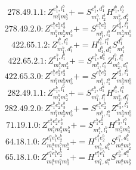 \documentclass[letterpaper,10pt,fleqn,leqno,onecolumn]{article}
\begin{document}
\begin{equation} \;\;\;\;\;\;  278.49.1.1: Z^{e_{1}^{b},l_{1}^{b}}_{m_{1}^{b}m_{2}^{b}}+=S^{e_{1}^{b},d_{1}^{b}}_{m_{1}^{b},l_{2}^{b}}H^{l_{1}^{b},l_{2}^{b}}_{m_{2}^{b},d_{1}^{b}} \end{equation}
\begin{equation} \;\;\;\;\;\;  278.49.2.0: Z^{e_{1}^{b}e_{2}^{b}e_{3}^{b}}_{m_{1}^{b}m_{2}^{b}m_{3}^{b}}+=S^{e_{1}^{b}e_{2}^{b}}_{m_{1}^{b},l_{1}^{b}}Z^{e_{3}^{b},l_{1}^{b}}_{m_{2}^{b}m_{3}^{b}} \end{equation}
\begin{equation} \;\;\;\;\;\;  422.65.1.2: Z^{l_{1}^{b},l_{1}^{a}}_{m_{1}^{b},d_{1}^{a}}+=H^{l_{1}^{b},l_{1}^{a}}_{d_{1}^{b},d_{1}^{a}}S^{d_{1}^{b}}_{m_{1}^{b}} \end{equation}
\begin{equation} \;\;\;\;\;\;  422.65.2.1: Z^{e_{1}^{b},l_{1}^{b}}_{m_{1}^{b}m_{2}^{b}}+=S^{e_{1}^{b},d_{1}^{a}}_{m_{1}^{b},l_{1}^{a}}Z^{l_{1}^{b},l_{1}^{a}}_{m_{2}^{b},d_{1}^{a}} \end{equation}
\begin{equation} \;\;\;\;\;\;  422.65.3.0: Z^{e_{1}^{b}e_{2}^{b}e_{3}^{b}}_{m_{1}^{b}m_{2}^{b}m_{3}^{b}}+=S^{e_{1}^{b}e_{2}^{b}}_{m_{1}^{b},l_{1}^{b}}Z^{e_{3}^{b},l_{1}^{b}}_{m_{2}^{b}m_{3}^{b}} \end{equation}
\begin{equation} \;\;\;\;\;\;  282.49.1.1: Z^{e_{1}^{b},l_{1}^{b}}_{m_{1}^{b}m_{2}^{b}}+=S^{e_{1}^{b},d_{1}^{a}}_{m_{1}^{b},l_{1}^{a}}H^{l_{1}^{b},l_{1}^{a}}_{m_{2}^{b},d_{1}^{a}} \end{equation}
\begin{equation} \;\;\;\;\;\;  282.49.2.0: Z^{e_{1}^{b}e_{2}^{b}e_{3}^{b}}_{m_{1}^{b}m_{2}^{b}m_{3}^{b}}+=S^{e_{1}^{b}e_{2}^{b}}_{m_{1}^{b},l_{1}^{b}}Z^{e_{3}^{b},l_{1}^{b}}_{m_{2}^{b}m_{3}^{b}} \end{equation}
\begin{equation} \;\;\;\;\;\;  71.19.1.0: Z^{e_{1}^{b}e_{2}^{b}e_{3}^{b}}_{m_{1}^{b}m_{2}^{b}m_{3}^{b}}+=S^{e_{1}^{b}e_{2}^{b}}_{m_{1}^{b},l_{1}^{b}}H^{e_{3}^{b},l_{1}^{b}}_{m_{2}^{b}m_{3}^{b}} \end{equation}
\begin{equation} \;\;\;\;\;\;  64.18.1.0: Z^{e_{1}^{a}e_{1}^{b}e_{2}^{b}}_{m_{1}^{a}m_{1}^{b}m_{2}^{b}}+=H^{e_{1}^{b}e_{2}^{b}}_{m_{1}^{b},d_{1}^{b}}S^{e_{1}^{a},d_{1}^{b}}_{m_{1}^{a}m_{2}^{b}} \end{equation}
\begin{equation} \;\;\;\;\;\;  65.18.1.0: Z^{e_{1}^{a}e_{1}^{b}e_{2}^{b}}_{m_{1}^{a}m_{1}^{b}m_{2}^{b}}+=H^{e_{1}^{a}e_{1}^{b}}_{m_{1}^{b},d_{1}^{a}}S^{e_{2}^{b},d_{1}^{a}}_{m_{1}^{a}m_{2}^{b}} \end{equation}
\end{document}
